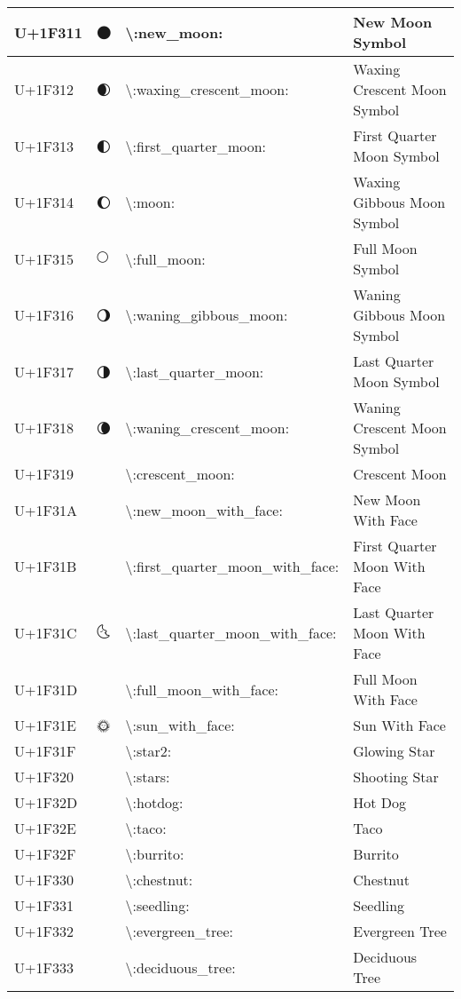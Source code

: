 \begin{table}[h]
\begin{tabulary}{\linewidth}{|L|L|L|L|}
\hline
U+1F311 & 🌑 & {\textbackslash}:new\_moon: & New Moon Symbol \\
\hline
U+1F312 & 🌒 & {\textbackslash}:waxing\_crescent\_moon: & Waxing Crescent Moon Symbol \\
\hline
U+1F313 & 🌓 & {\textbackslash}:first\_quarter\_moon: & First Quarter Moon Symbol \\
\hline
U+1F314 & 🌔 & {\textbackslash}:moon: & Waxing Gibbous Moon Symbol \\
\hline
U+1F315 & 🌕 & {\textbackslash}:full\_moon: & Full Moon Symbol \\
\hline
U+1F316 & 🌖 & {\textbackslash}:waning\_gibbous\_moon: & Waning Gibbous Moon Symbol \\
\hline
U+1F317 & 🌗 & {\textbackslash}:last\_quarter\_moon: & Last Quarter Moon Symbol \\
\hline
U+1F318 & 🌘 & {\textbackslash}:waning\_crescent\_moon: & Waning Crescent Moon Symbol \\
\hline
U+1F319 & 🌙 & {\textbackslash}:crescent\_moon: & Crescent Moon \\
\hline
U+1F31A & 🌚 & {\textbackslash}:new\_moon\_with\_face: & New Moon With Face \\
\hline
U+1F31B & 🌛 & {\textbackslash}:first\_quarter\_moon\_with\_face: & First Quarter Moon With Face \\
\hline
U+1F31C & 🌜 & {\textbackslash}:last\_quarter\_moon\_with\_face: & Last Quarter Moon With Face \\
\hline
U+1F31D & 🌝 & {\textbackslash}:full\_moon\_with\_face: & Full Moon With Face \\
\hline
U+1F31E & 🌞 & {\textbackslash}:sun\_with\_face: & Sun With Face \\
\hline
U+1F31F & 🌟 & {\textbackslash}:star2: & Glowing Star \\
\hline
U+1F320 & 🌠 & {\textbackslash}:stars: & Shooting Star \\
\hline
U+1F32D & 🌭 & {\textbackslash}:hotdog: & Hot Dog \\
\hline
U+1F32E & 🌮 & {\textbackslash}:taco: & Taco \\
\hline
U+1F32F & 🌯 & {\textbackslash}:burrito: & Burrito \\
\hline
U+1F330 & 🌰 & {\textbackslash}:chestnut: & Chestnut \\
\hline
U+1F331 & 🌱 & {\textbackslash}:seedling: & Seedling \\
\hline
U+1F332 & 🌲 & {\textbackslash}:evergreen\_tree: & Evergreen Tree \\
\hline
U+1F333 & 🌳 & {\textbackslash}:deciduous\_tree: & Deciduous Tree \\

\end{tabulary}
\end{table}
